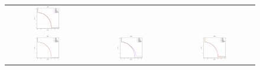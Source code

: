 \begin{figure}[H]
\begin{tabular}{ccc}
  \includegraphics[width=0.33\textwidth]{Figures_Chapter7/Results_Chapter4/Surface_Representative/WFG6.eps} \\
  \includegraphics[width=0.33\textwidth]{Figures_Chapter7/Results_Chapter4/Surface_Representative/WFG7.eps} &
  \includegraphics[width=0.33\textwidth]{Figures_Chapter7/Results_Chapter4/Surface_Representative/WFG8.eps} &
  \includegraphics[width=0.33\textwidth]{Figures_Chapter7/Results_Chapter4/Surface_Representative/WFG9.eps}
\end{tabular}
\end{figure}
